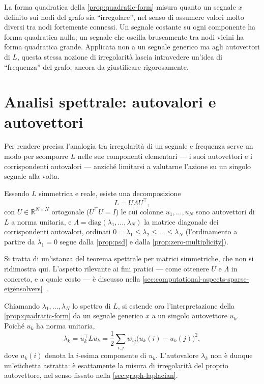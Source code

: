 La forma quadratica della \cref{prop:quadratic-form} misura quanto un segnale $x$ definito sui nodi del grafo sia \enquote{irregolare}, nel senso di assumere valori molto diversi tra nodi fortemente connessi. Un segnale costante su ogni componente ha forma quadratica nulla; un segnale che oscilla bruscamente tra nodi vicini ha forma quadratica grande. Applicata non a un segnale generico ma agli autovettori di $L$, questa stessa nozione di irregolarità lascia intravedere un'idea di \enquote{frequenza} del grafo, ancora da giustificare rigorosamente.

\section{Analisi spettrale: autovalori e autovettori}
\label{sec:spectral-analysis}

Per rendere precisa l'analogia tra irregolarità di un segnale e frequenza serve un modo per scomporre $L$ nelle sue componenti elementari — i suoi autovettori e i corrispondenti autovalori — anziché limitarsi a valutarne l'azione su un singolo segnale alla volta.

\begin{theorem}
\label{thm:spectral-decomposition}
Essendo $L$ simmetrica e reale, esiste una decomposizione
$$L = U\Lambda U^\top,$$
con $U \in \mathbb{R}^{N\times N}$ ortogonale ($U^\top U = I$) le cui colonne $u_1,\dots,u_N$ sono autovettori di $L$ a norma unitaria, e $\Lambda = \mathrm{diag}(\lambda_1,\dots,\lambda_N)$ la matrice diagonale dei corrispondenti autovalori, ordinati $0 = \lambda_1 \leq \lambda_2 \leq \dots \leq \lambda_N$ (l'ordinamento a partire da $\lambda_1=0$ segue dalla \cref{prop:psd} e dalla \cref{prop:zero-multiplicity}).
\end{theorem}

Si tratta di un'istanza del teorema spettrale per matrici simmetriche, che non si ridimostra qui. L'aspetto rilevante ai fini pratici — come ottenere $U$ e $\Lambda$ in concreto, e a quale costo — è discusso nella \cref{sec:computational-aspects-sparse-eigensolvers}~\cite{golub2013matrix}.

Chiamando $\lambda_1,\dots,\lambda_N$ lo spettro di $L$, si estende ora l'interpretazione della \cref{prop:quadratic-form} da un segnale generico $x$ a un singolo autovettore $u_k$. Poiché $u_k$ ha norma unitaria,
$$\lambda_k = u_k^\top L u_k = \frac12\sum_{i,j}w_{ij}\big(u_k(i)-u_k(j)\big)^2,$$
dove $u_k(i)$ denota la $i$-esima componente di $u_k$. L'autovalore $\lambda_k$ non è dunque un'etichetta astratta: è esattamente la misura di irregolarità del proprio autovettore, nel senso fissato nella \cref{sec:graph-laplacian}.

